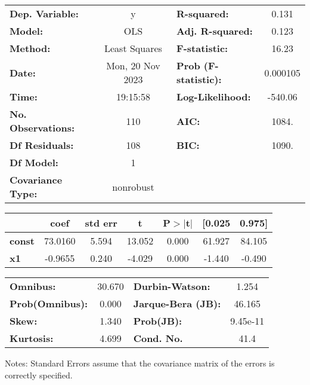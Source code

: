 \begin{center}
\begin{tabular}{lclc}
\toprule
\textbf{Dep. Variable:}    &        y         & \textbf{  R-squared:         } &     0.131   \\
\textbf{Model:}            &       OLS        & \textbf{  Adj. R-squared:    } &     0.123   \\
\textbf{Method:}           &  Least Squares   & \textbf{  F-statistic:       } &     16.23   \\
\textbf{Date:}             & Mon, 20 Nov 2023 & \textbf{  Prob (F-statistic):} &  0.000105   \\
\textbf{Time:}             &     19:15:58     & \textbf{  Log-Likelihood:    } &   -540.06   \\
\textbf{No. Observations:} &         110      & \textbf{  AIC:               } &     1084.   \\
\textbf{Df Residuals:}     &         108      & \textbf{  BIC:               } &     1090.   \\
\textbf{Df Model:}         &           1      & \textbf{                     } &             \\
\textbf{Covariance Type:}  &    nonrobust     & \textbf{                     } &             \\
\bottomrule
\end{tabular}
\begin{tabular}{lcccccc}
               & \textbf{coef} & \textbf{std err} & \textbf{t} & \textbf{P$> |$t$|$} & \textbf{[0.025} & \textbf{0.975]}  \\
\midrule
\textbf{const} &      73.0160  &        5.594     &    13.052  &         0.000        &       61.927    &       84.105     \\
\textbf{x1}    &      -0.9655  &        0.240     &    -4.029  &         0.000        &       -1.440    &       -0.490     \\
\bottomrule
\end{tabular}
\begin{tabular}{lclc}
\textbf{Omnibus:}       & 30.670 & \textbf{  Durbin-Watson:     } &    1.254  \\
\textbf{Prob(Omnibus):} &  0.000 & \textbf{  Jarque-Bera (JB):  } &   46.165  \\
\textbf{Skew:}          &  1.340 & \textbf{  Prob(JB):          } & 9.45e-11  \\
\textbf{Kurtosis:}      &  4.699 & \textbf{  Cond. No.          } &     41.4  \\
\bottomrule
\end{tabular}
\end{center}

Notes: \newline
 [1] Standard Errors assume that the covariance matrix of the errors is correctly specified.